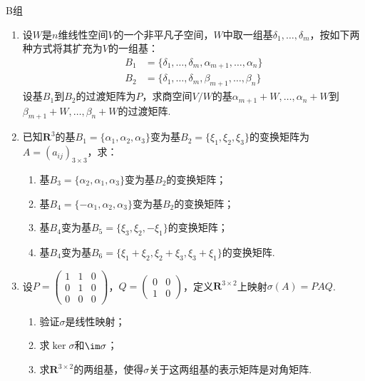 \centerline{\heiti B组}
\begin{enumerate}
    \item 设$W$是$n$维线性空间$V$的一个非平凡子空间，$W$中取一组基$\delta_1,\ldots,\delta_m$，按如下两种方式将其扩充为$V$的一组基：
    \begin{align*}
        B_1 & =\{\delta_1,\ldots,\delta_m,\alpha_{m+1},\ldots,\alpha_n\} \\
        B_2 & =\{\delta_1,\ldots,\delta_m,\beta_{m+1},\ldots,\beta_n\}
    \end{align*}
    设基$B_1$到$B_2$的过渡矩阵为$P$，求商空间$V/W$的基$\alpha_{m+1}+W,\ldots,\alpha_n+W$到$\beta_{m+1}+W,\ldots,\beta_n+W$的过渡矩阵.

    \item 已知$\mathbf{R}^3$的基$B_1=\{\alpha_1,\alpha_2,\alpha_3\}$变为基$B_2=\{\xi_1,\xi_2,\xi_3\}$的变换矩阵为$A=(a_{ij})_{3 \times 3}$，求：
    \begin{enumerate}
        \item 基$B_3=\{\alpha_2,\alpha_1,\alpha_3\}$变为基$B_2$的变换矩阵；

        \item 基$B_4=\{-\alpha_1,\alpha_2,\alpha_3\}$变为基$B_2$的变换矩阵；

        \item 基$B_4$变为基$B_5=\{\xi_3,\xi_2,-\xi_1\}$的变换矩阵；

        \item 基$B_4$变为基$B_6=\{\xi_1+\xi_2,\xi_2+\xi_3,\xi_3+\xi_1\}$的变换矩阵.
    \end{enumerate}

\item 设$P=\begin{pmatrix}
            1 & 1 & 0 \\ 0 & 1 & 0 \\ 0 & 0 & 0
        \end{pmatrix}$，$Q=\begin{pmatrix}
            0 & 0 \\ 1 & 0
        \end{pmatrix}$，定义$\mathbf{R}^{3\times 2}$上映射$\sigma(A)=PAQ$.
    \begin{enumerate}
        \item 验证$\sigma$是线性映射；

        \item 求$\ker\sigma$和$\im \sigma$；

        \item 求$\mathbf{R}^{3\times 2}$的两组基，使得$\sigma$关于这两组基的表示矩阵是对角矩阵.
    \end{enumerate}


\end{enumerate}
